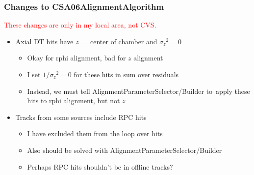 \documentclass[compress]{beamer}
\begin{document}
\begin{frame}
\frametitle{Changes to CSA06AlignmentAlgorithm}
\textcolor{red}{These changes are only in my local area, not CVS.}

\vfill
\begin{itemize}\setlength{\itemsep}{0.5 cm}
  \item Axial DT hits have $z =$ center of chamber and ${\sigma_z}^2 = 0$
    \begin{itemize}\setlength{\itemsep}{0.25 cm}
      \item Okay for rphi alignment, bad for $z$ alignment
      \item I set $1/{\sigma_z}^2 = 0$ for these hits in sum over residuals
      \item Instead, we must tell AlignmentParameterSelector/Builder \mbox{to apply}
      these hits to rphi alignment, but not $z$
    \end{itemize}

  \item Tracks from some sources include RPC hits
    \begin{itemize}\setlength{\itemsep}{0.25 cm}
      \item I have excluded them from the loop over hits
      \item Also should be solved with AlignmentParameterSelector/Builder
      \item Perhaps RPC hits shouldn't be in offline tracks?
    \end{itemize}
\end{itemize}
\end{frame}
\end{document}
